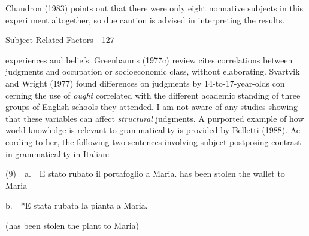 \begin{listWWNumxxxvleveli}
\item 
\begin{styleStandard}
Chaudron (1983) points out that there were only eight nonnative subjects in this experi\- ment altogether, so due caution is advised in interpreting the results.
\end{styleStandard}


\end{listWWNumxxxvleveli}
\clearpage\setcounter{page}{1}\begin{styleStandard}
Subject-Related Factors\ \ 127
\end{styleStandard}


\begin{styleTextbody}
experiences and beliefs. Greenbaum{\textquotesingle}s (1977c) review cites correlations between judgments and occupation or socioeconomic class, without elaborating. Svartvik and Wright (1977) found differences on judgments by 14-to-17-year-olds con\- cerning the use of \textit{ought}\textit{ }correlated with the different academic standing of three groups of English schools they attended. I am not aware of any studies showing that these variables can affect \textit{structural}\textit{ }judgments. A purported example of how world knowledge is relevant to grammaticality is provided by Belletti (1988). Ac\- cording to her, the following two sentences involving subject postposing contrast in grammaticality in Italian:
\end{styleTextbody}


\begin{styleTextbody}
(9)\ \ a.\ \ E stato rubato il portafoglio a Maria. {\textquotesingle}has been stolen the wallet to Maria{\textquotesingle}
\end{styleTextbody}


\begin{styleTextbody}
b.\ \ *E stata rubata la pianta a Maria.
\end{styleTextbody}


\begin{styleTextbody}
({\textquotesingle}has been stolen the plant to Maria{\textquotesingle})
\end{styleTextbody}


